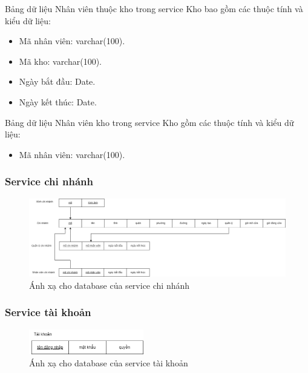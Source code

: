 Bảng dữ liệu Nhân viên thuộc kho trong service Kho bao gồm các thuộc tính và kiểu dữ liệu:
\begin{itemize}
	\item Mã nhân viên: varchar(100).
	\item Mã kho: varchar(100).
	\item Ngày bắt đầu: Date.
	\item Ngày kết thúc: Date.
\end{itemize}

Bảng dữ liệu Nhân viên kho trong service Kho gồm các thuộc tính và kiểu dữ liệu:
\begin{itemize}
	\item Mã nhân viên: varchar(100).
\end{itemize}

\subsubsection{Service chi nhánh}
\begin{figure}[!htp]
	\begin{center}
		\includegraphics[width=1\textwidth]{img/database/mapping/branch.png}
		\newline
		\caption{Ánh xạ cho database của service chi nhánh}
	\end{center}
\end{figure}


\subsubsection{Service tài khoản}
\begin{figure}[!htp]
	\begin{center}
		\includegraphics[width=5cm]{img/database/mapping/account.png}
		\newline
		\caption{Ánh xạ cho database của service tài khoản}
	\end{center}
\end{figure}

